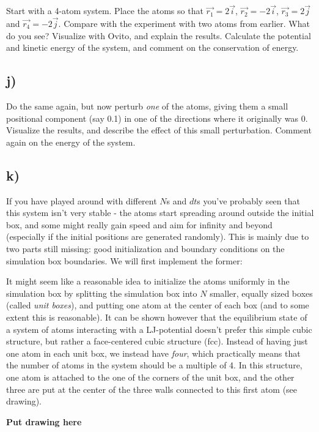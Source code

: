 \documentclass[11pt,british,a4paper]{report}
\begin{document}
Start with a 4-atom system. Place the atoms so that $\vec{r_1} = 2\vec{i}$, $\vec{r_2} = -2\vec{i}$, $\vec{r_3} = 2\vec{j}$ and $\vec{r_4} = -2\vec{j}$. Compare with the experiment with two atoms
from earlier. What do you see? Visualize with Ovito, and explain the results. Calculate the potential and kinetic energy of the system, and comment on the conservation of energy.

\subsection*{j)}

Do the same again, but now perturb \textit{one} of the atoms, giving them a small positional component (say 0.1) in one of the directions where it originally was 0. Visualize the results,
and describe the effect of this small perturbation. Comment again on the energy of the system.

\subsection*{k)}

If you have played around with different $N$s and $dt$s you've probably seen that this system isn't very stable - the atoms start spreading around outside the initial box, and some might really gain speed and
aim for infinity and beyond (especially if the initial positions are generated randomly). This is mainly due to two parts still missing: good initialization and boundary conditions on
the simulation box boundaries. We will first implement the former:

It might seem like a reasonable idea to initialize the atoms uniformly in the simulation box by splitting the simulation box into $N$ smaller, equally sized boxes (called \textit{unit boxes}), and
putting one atom at the center of each box (and to some extent this is reasonable). It can be shown however that the equilibrium state of a system of atoms interacting with a LJ-potential
doesn't prefer this simple cubic structure, but rather a face-centered cubic structure (fcc). Instead of having just one atom in each unit box, we instead have \textit{four}, which
practically means that the number of atoms in the system should be a multiple of 4. In this structure, one atom is attached to the one of the corners of the unit box, and the other three are
put at the center of the three walls connected to this first atom (see drawing).

\textbf{Put drawing here}
\end{document}

